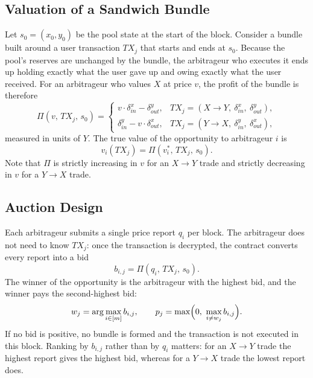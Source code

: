 \subsection{Valuation of a Sandwich Bundle}

Let $s_0=(x_0,y_0)$ be the pool state at the start of the block. Consider a bundle built around a user transaction $TX_j$ that starts and ends at $s_0$. Because the pool's reserves are unchanged by the bundle, the arbitrageur who executes it ends up holding exactly what the user gave up and owing exactly what the user received. For an arbitrageur who values $X$ at price $v$, the profit of the bundle is therefore
\begin{equation}
\Pi(v,\,TX_j,\,s_0)=
\begin{cases}
v\cdot\delta^{x}_{in}-\delta^{y}_{out}, & TX_j=(X\rightarrow Y,\ \delta^{x}_{in},\ \delta^{y}_{out}),\\[4pt]
\delta^{y}_{in}-v\cdot\delta^{x}_{out}, & TX_j=(Y\rightarrow X,\ \delta^{y}_{in},\ \delta^{x}_{out}),
\end{cases}
\label{eq:pi}
\end{equation}
measured in units of $Y$. The true value of the opportunity to arbitrageur $i$ is
\begin{equation}
v_i(TX_j)=\Pi(v_i^{*},\,TX_j,\,s_0).
\label{eq:value}
\end{equation}
Note that $\Pi$ is strictly increasing in $v$ for an $X\rightarrow Y$ trade and strictly decreasing in $v$ for a $Y\rightarrow X$ trade.

\subsection{Auction Design}

Each arbitrageur submits a single price report $q_i$ per block. The arbitrageur does not need to know $TX_j$: once the transaction is decrypted, the contract converts every report into a bid
\begin{equation}
b_{i,j}=\Pi(q_i,\,TX_j,\,s_0).
\label{eq:bid}
\end{equation}
The winner of the opportunity is the arbitrageur with the highest bid, and the winner pays the second-highest bid:
\begin{equation}
w_j=\arg\max_{i\in[m]} b_{i,j},
\qquad
p_j=\max\Bigl(0,\ \max_{i\neq w_j} b_{i,j}\Bigr).
\label{eq:winner}
\end{equation}
If no bid is positive, no bundle is formed and the transaction is not executed in this block. Ranking by $b_{i,j}$ rather than by $q_i$ matters: for an $X\rightarrow Y$ trade the highest report gives the highest bid, whereas for a $Y\rightarrow X$ trade the lowest report does.

